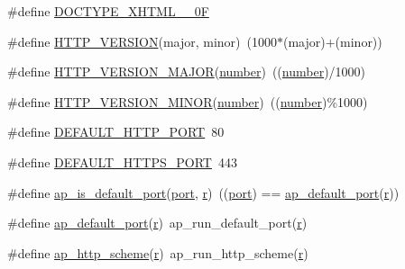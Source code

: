 \begin{DoxyCompactItemize}
\item 
\#define \hyperlink{group__APACHE__CORE__DAEMON_ga989caf00bd323a633f5da00ea176c6c5}{D\+O\+C\+T\+Y\+P\+E\+\_\+\+X\+H\+T\+M\+L\+\_\+\_\+0F}
\item 
\#define \hyperlink{group__APACHE__CORE__DAEMON_gab48aba3b8935a26d38b88710041a1b6a}{H\+T\+T\+P\+\_\+\+V\+E\+R\+S\+I\+ON}(major,  minor)~(1000$\ast$(major)+(minor))
\item 
\#define \hyperlink{group__APACHE__CORE__DAEMON_ga16b14e7e138666eaf8d415a9f27f2768}{H\+T\+T\+P\+\_\+\+V\+E\+R\+S\+I\+O\+N\+\_\+\+M\+A\+J\+OR}(\hyperlink{pcretest_8txt_a7965c027cf47c0c0e2396d2f8e6b40c3}{number})~((\hyperlink{pcretest_8txt_a7965c027cf47c0c0e2396d2f8e6b40c3}{number})/1000)
\item 
\#define \hyperlink{group__APACHE__CORE__DAEMON_ga4f29ee79b19591bbf34147bce2d84b0b}{H\+T\+T\+P\+\_\+\+V\+E\+R\+S\+I\+O\+N\+\_\+\+M\+I\+N\+OR}(\hyperlink{pcretest_8txt_a7965c027cf47c0c0e2396d2f8e6b40c3}{number})~((\hyperlink{pcretest_8txt_a7965c027cf47c0c0e2396d2f8e6b40c3}{number})\%1000)
\item 
\#define \hyperlink{group__APACHE__CORE__DAEMON_gabc476b8e19df2e50e6759f1832030a7b}{D\+E\+F\+A\+U\+L\+T\+\_\+\+H\+T\+T\+P\+\_\+\+P\+O\+RT}~80
\item 
\#define \hyperlink{group__APACHE__CORE__DAEMON_ga88dcc6802211651387bab81dea44468f}{D\+E\+F\+A\+U\+L\+T\+\_\+\+H\+T\+T\+P\+S\+\_\+\+P\+O\+RT}~443
\item 
\#define \hyperlink{group__APACHE__CORE__DAEMON_gae5bc38a44a7c51bef163b8208559f3a1}{ap\+\_\+is\+\_\+default\+\_\+port}(\hyperlink{ab_8c_ab3bdaca3e004f9926a8c2530f1d9e9dc}{port},  \hyperlink{pcregrep_8txt_a2e9e9438b26c0bb4425367a7e4f75eb3}{r})~((\hyperlink{ab_8c_ab3bdaca3e004f9926a8c2530f1d9e9dc}{port}) == \hyperlink{group__APACHE__CORE__DAEMON_ga40a8e6df164cf715f55dcddd384d0c26}{ap\+\_\+default\+\_\+port}(\hyperlink{pcregrep_8txt_a2e9e9438b26c0bb4425367a7e4f75eb3}{r}))
\item 
\#define \hyperlink{group__APACHE__CORE__DAEMON_ga40a8e6df164cf715f55dcddd384d0c26}{ap\+\_\+default\+\_\+port}(\hyperlink{pcregrep_8txt_a2e9e9438b26c0bb4425367a7e4f75eb3}{r})~ap\+\_\+run\+\_\+default\+\_\+port(\hyperlink{pcregrep_8txt_a2e9e9438b26c0bb4425367a7e4f75eb3}{r})
\item 
\#define \hyperlink{group__APACHE__CORE__DAEMON_ga486f75485b725c5c3baaa577409d36f3}{ap\+\_\+http\+\_\+scheme}(\hyperlink{pcregrep_8txt_a2e9e9438b26c0bb4425367a7e4f75eb3}{r})~ap\+\_\+run\+\_\+http\+\_\+scheme(\hyperlink{pcregrep_8txt_a2e9e9438b26c0bb4425367a7e4f75eb3}{r})

\end{DoxyCompactItemize}
